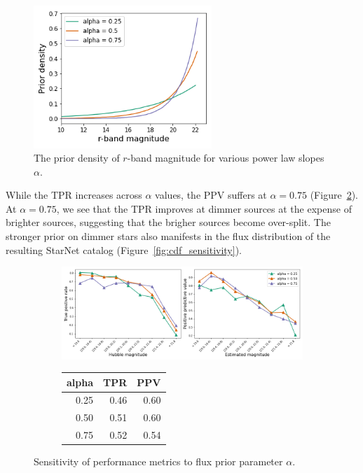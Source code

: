 \begin{figure}[tb]
    \centering
    \includegraphics[width = 0.6\textwidth]{figures/prior_sensitivity/prior_fluxes.png}
    \caption{The prior density of $r$-band magnitude for various power law slopes $\alpha$.}
    \label{fig:flux_priors}
\end{figure}

While the TPR increases across $\alpha$ values, the PPV suffers at $\alpha = 0.75$ (Figure~\ref{fig:alpha_sensitivity}).
At $\alpha = 0.75$, we see that the TPR improves at dimmer sources at the expense of brighter sources, suggesting that the brigher sources become over-split. 
The stronger prior on dimmer stars also manifests in the flux distribution of the resulting StarNet catalog (Figure~\ref{fig:cdf_sensitivity}). 

\begin{figure}[tb]
\begin{subfigure}{\textwidth}
\centering
\includegraphics[width = \textwidth]{figures/prior_sensitivity/prior_alpha_sensitivity.png}
\end{subfigure}
\begin{subfigure}{\textwidth}
\begin{center}
\begin{tabular}{rrr}
\toprule
 alpha &   TPR &   PPV \\
\midrule
  0.25 &  0.46 &  0.60 \\
  0.50 &  0.51 &  0.60 \\
  0.75 &  0.52 &  0.54 \\
\bottomrule
\end{tabular}
\par\vspace{0pt}
\end{center}
\end{subfigure}\hfill
\caption{Sensitivity of performance metrics to flux prior parameter $\alpha$. }
\label{fig:alpha_sensitivity}
\end{figure}

